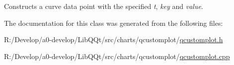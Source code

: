 Constructs a curve data point with the specified {\itshape t}, {\itshape key} and {\itshape value}. 

The documentation for this class was generated from the following files\+:\begin{DoxyCompactItemize}
\item 
R\+:/\+Develop/a0-\/develop/\+Lib\+Q\+Qt/src/charts/qcustomplot/\mbox{\hyperlink{qcustomplot_8h}{qcustomplot.\+h}}\item 
R\+:/\+Develop/a0-\/develop/\+Lib\+Q\+Qt/src/charts/qcustomplot/\mbox{\hyperlink{qcustomplot_8cpp}{qcustomplot.\+cpp}}\end{DoxyCompactItemize}
